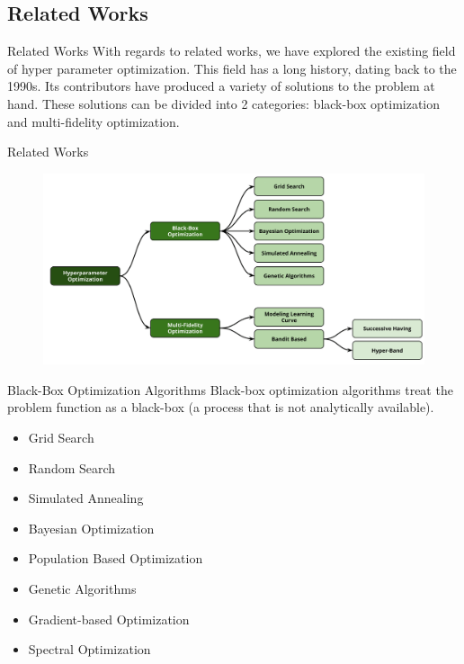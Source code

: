 \documentclass[10pt]{beamer}
\begin{document}
  \subsection{Related Works}
  \begin{frame}{Related Works}
    With regards to related works, we have explored the existing field of hyper parameter optimization. This field has a long history, dating back to the 1990s. Its contributors have produced a variety of solutions to the problem at hand. These solutions can be divided into 2 categories: black-box optimization and multi-fidelity optimization.
  \end{frame}
  \begin{frame}{Related Works}
    \begin{figure}
          \centering
          \includegraphics[width=\textwidth]{images/state_art-taxonomy_optimizers.png}
        \end{figure}
  \end{frame}
  \begin{frame}{Black-Box Optimization Algorithms}
    Black-box optimization algorithms treat the problem function as a black-box (a process that is not analytically available).
    \begin{itemize}
      \item{Grid Search}
      \item{Random Search}
      \item{Simulated Annealing}
      \item{Bayesian Optimization}
      \item{Population Based Optimization}
      \item{Genetic Algorithms}
      \item{Gradient-based Optimization}
      \item{Spectral Optimization}
    \end{itemize}
  \end{frame}
\end{document}
